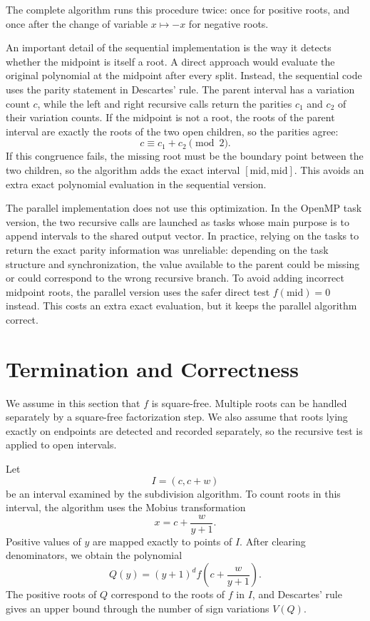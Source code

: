 \documentclass[letterpaper]{article}
\begin{document}
The complete algorithm runs this procedure twice: once for positive roots, and
once after the change of variable $x \mapsto -x$ for negative roots.

An important detail of the sequential implementation is the way it detects
whether the midpoint is itself a root. A direct approach would evaluate the
original polynomial at the midpoint after every split. Instead, the sequential
code uses the parity statement in Descartes' rule. The parent interval has a
variation count $c$, while the left and right recursive calls return the
parities $c_1$ and $c_2$ of their variation counts. If the midpoint is not a
root, the roots of the parent interval are exactly the roots of the two open
children, so the parities agree:
\[
  c \equiv c_1+c_2 \pmod 2.
\]
If this congruence fails, the missing root must be the boundary point between
the two children, so the algorithm adds the exact interval $[\mathrm{mid},
\mathrm{mid}]$. This avoids an extra exact polynomial evaluation in the
sequential version.

The parallel implementation does not use this optimization. In the OpenMP task
version, the two recursive calls are launched as tasks whose main purpose is
to append intervals to the shared output vector. In practice, relying on the
tasks to return the exact parity information was unreliable: depending on the
task structure and synchronization, the value available to the parent could be
missing or could correspond to the wrong recursive branch. To avoid adding
incorrect midpoint roots, the parallel version uses the safer direct test
$f(\mathrm{mid})=0$ instead. This costs an extra exact evaluation, but it keeps
the parallel algorithm correct.

\section{Termination and Correctness}

We assume in this section that $f$ is square-free. Multiple roots can be
handled separately by a square-free factorization step. We also assume that
roots lying exactly on endpoints are detected and recorded separately, so the
recursive test is applied to open intervals.

Let
\[
  I=(c,c+w)
\]
be an interval examined by the subdivision algorithm. To count roots in this
interval, the algorithm uses the Mobius transformation
\[
  x = c+\frac{w}{y+1}.
\]
Positive values of $y$ are mapped exactly to points of $I$. After clearing
denominators, we obtain the polynomial
\[
  Q(y)=(y+1)^d f\!\left(c+\frac{w}{y+1}\right).
\]
The positive roots of $Q$ correspond to the roots of $f$ in $I$, and
Descartes' rule gives an upper bound through the number of sign variations
$V(Q)$.
\end{document}
